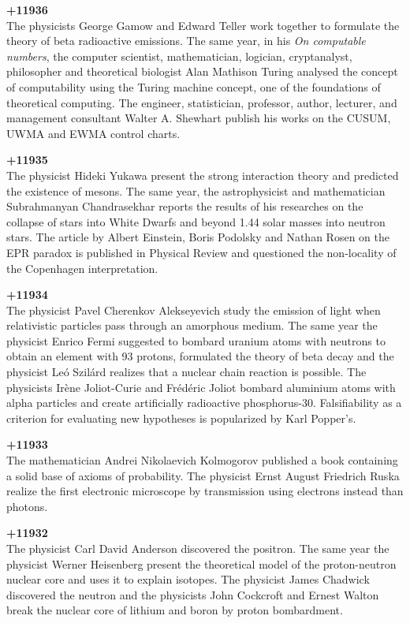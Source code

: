 \textbf{+11936}\\
The physicists George Gamow and Edward Teller work together to formulate the theory of beta radioactive emissions. The same year, in his \textit{On computable numbers}, the computer scientist, mathematician, logician, cryptanalyst, philosopher and theoretical biologist Alan Mathison Turing analysed the concept of computability using the Turing machine concept, one of the foundations of theoretical computing. The engineer, statistician, professor, author, lecturer, and management consultant Walter A. Shewhart publish his works on the CUSUM, UWMA and EWMA control charts.

\textbf{+11935}\\
The physicist Hideki Yukawa present the strong interaction theory and predicted the existence of mesons. The same year, the astrophysicist and mathematician Subrahmanyan Chandrasekhar reports the results of his researches on the collapse of stars into White Dwarfs and beyond 1.44 solar masses into neutron stars. The article by Albert Einstein, Boris Podolsky and Nathan Rosen on the EPR paradox is published in Physical Review and questioned the non-locality of the Copenhagen interpretation.

\textbf{+11934}\\
The physicist Pavel Cherenkov Alekseyevich study the emission of light when relativistic particles pass through an amorphous medium. The same year the physicist Enrico Fermi suggested to bombard uranium atoms with neutrons to obtain an element with 93 protons, formulated the theory of beta decay and the physicist Leó Szilárd realizes that a nuclear chain reaction is possible. The physicists Irène Joliot-Curie and Frédéric Joliot bombard aluminium atoms with alpha particles and create artificially radioactive phosphorus-30. Falsifiability as a criterion for evaluating new hypotheses is popularized by Karl Popper's.

\textbf{+11933}\\
The mathematician Andrei Nikolaevich Kolmogorov published a book containing a solid base of axioms of probability. The physicist Ernst August Friedrich Ruska realize the first electronic microscope by transmission using electrons instead than photons.

\textbf{+11932}\\
The physicist Carl David Anderson discovered the positron. The same year the physicist Werner Heisenberg present the theoretical model of the proton-neutron nuclear core and uses it to explain isotopes. The physicist James Chadwick discovered the neutron and the physicists John Cockcroft and Ernest Walton break the nuclear core of lithium and boron by proton bombardment.

